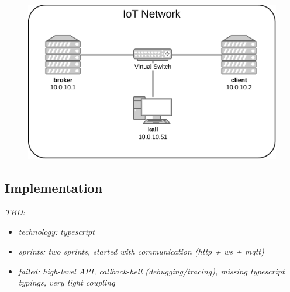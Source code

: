 \begin{figure}
    \centering
    \includegraphics[width=12cm]{img/ch04/Testbed.pdf}
    \label{fig:testbed}
\end{figure}

\subsection{Implementation}
\emph{TBD:}  %
\begin{itemize}
    \item \emph{technology: typescript}
    \item \emph{sprints: two sprints, started with communication (http + ws + mqtt)}
    \item \emph{failed: high-level API, callback-hell (debugging/tracing), missing typescript typings, very tight coupling}
\end{itemize}

